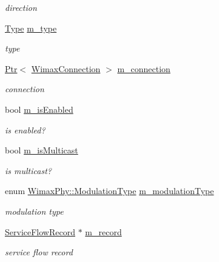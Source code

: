 \begin{DoxyCompactItemize}
\begin{DoxyCompactList}\small\item\em direction \end{DoxyCompactList}\item 
\hyperlink{classns3_1_1ServiceFlow_a95a18bd8cae3a4eaa3568dad45ae941d}{Type} \hyperlink{classns3_1_1ServiceFlow_ad1b095fd8f862919aca414efd94ab05a}{m\+\_\+type}
\begin{DoxyCompactList}\small\item\em type \end{DoxyCompactList}\item 
\hyperlink{classns3_1_1Ptr}{Ptr}$<$ \hyperlink{classns3_1_1WimaxConnection}{Wimax\+Connection} $>$ \hyperlink{classns3_1_1ServiceFlow_a5655fd21757cc55c16943c453bad928d}{m\+\_\+connection}
\begin{DoxyCompactList}\small\item\em connection \end{DoxyCompactList}\item 
bool \hyperlink{classns3_1_1ServiceFlow_a4ae8c3beb9b40872267e6fb6e6c61c84}{m\+\_\+is\+Enabled}
\begin{DoxyCompactList}\small\item\em is enabled? \end{DoxyCompactList}\item 
bool \hyperlink{classns3_1_1ServiceFlow_a8cdd6fb9780b799ef623c3a6dc8e127d}{m\+\_\+is\+Multicast}
\begin{DoxyCompactList}\small\item\em is multicast? \end{DoxyCompactList}\item 
enum \hyperlink{classns3_1_1WimaxPhy_a044c5d8a48ca992c39c2a946f6e755fa}{Wimax\+Phy\+::\+Modulation\+Type} \hyperlink{classns3_1_1ServiceFlow_a0f223bac27e2db3d1508611d48379587}{m\+\_\+modulation\+Type}
\begin{DoxyCompactList}\small\item\em modulation type \end{DoxyCompactList}\item 
\hyperlink{classns3_1_1ServiceFlowRecord}{Service\+Flow\+Record} $\ast$ \hyperlink{classns3_1_1ServiceFlow_aa35cc96a2815d89663d87b612e61bb3e}{m\+\_\+record}
\begin{DoxyCompactList}\small\item\em service flow record \end{DoxyCompactList}\end{DoxyCompactItemize}


